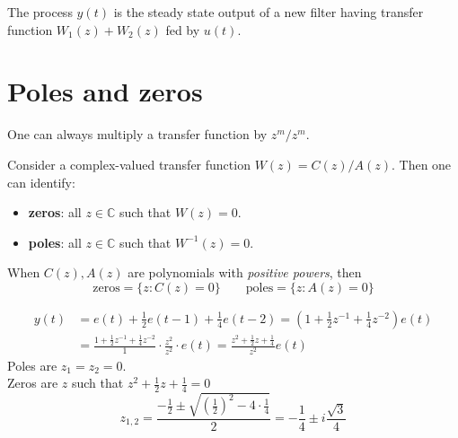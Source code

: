 \begin{figure}[htpb]
	\centering
\end{figure}
\FloatBarrier
\begin{thm}
	The process $y(t)$ is the steady state output of a new filter having transfer function $W_{1}(z)+W_{2}(z)$ fed by $u(t)$.
\end{thm}

\section{Poles and zeros}

\begin{rem}
	One can always multiply a transfer function by $z^{m}/z^{m}$.

	Consider a complex-valued transfer function $W(z)=C(z)/A(z)$. Then one can identify:
	\begin{itemize}
		\item \textbf{zeros}: all $z\in \mathbb{C}$ such that $W(z)=0$.
		\item \textbf{poles}: all $z\in \mathbb{C}$ such that $W^{-1} (z)=0$.
	\end{itemize}
	When $C(z),A(z)$ are polynomials with \emph{positive powers}, then
	\[
		\text{zeros}=\{z:C(z)=0\} \qquad \text{poles}=\{z:A(z)=0\}
	\]
\end{rem}
\begin{exa}
\begin{align*}
y(t) &=e(t)+\frac{1}{2} e(t-1)+\frac{1}{4} e(t-2) =\left(1+\frac{1}{2} z^{-1}+\frac{1}{4} z^{-2}\right) e(t) \\
&=\frac{1+\frac{1}{2} z^{-1}+\frac{1}{4} z^{-2}}{1} \cdot \frac{z^{2}}{z^{2}}\cdot e(t) =\frac{z^{2}+\frac{1}{2} z+\frac{1}{4}}{z^{2}} e(t)
\end{align*}
Poles are $z_{1}=z_{2}=0$.\\
Zeros are $z$ such that $z^{2}+\frac{1}{2} z+\frac{1}{4}=0$
\[
	z_{1,2}=\frac{-\frac{1}{2} \pm \sqrt{\left( \frac{1}{2}  \right) ^2 -4\cdot\frac{1}{4} } }{2} = -\frac{1}{4}\pm i\frac{\sqrt{3} }{4}
\]
\end{exa}

